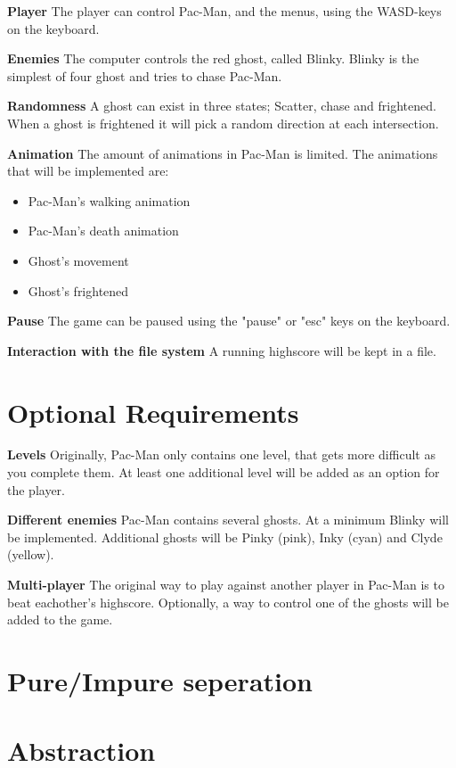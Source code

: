 \documentclass[11pt]{Article}
\begin{document}
\textbf{Player} The player can control Pac-Man, and the menus, using the WASD-keys on the keyboard.

\textbf{Enemies} The computer controls the red ghost, called Blinky. Blinky is the simplest of four ghost and tries to chase Pac-Man.

\textbf{Randomness} A ghost can exist in three states; Scatter, chase and frightened. When a ghost is frightened it will pick a random direction at each intersection.

\textbf{Animation} The amount of animations in Pac-Man is limited. The animations that will be implemented are:
\begin{itemize}
  \item Pac-Man's walking animation
  \item Pac-Man's death animation
  \item Ghost's movement
  \item Ghost's frightened
\end{itemize}

\textbf{Pause} The game can be paused using the "pause" or "esc" keys on the keyboard.

\textbf{Interaction with the file system} A running highscore will be kept in a file.

\section{Optional Requirements} \label{ch:optionalRequirements}

\textbf{Levels} Originally, Pac-Man only contains one level, that gets more difficult as you complete them. At least one additional level will be added as an option for the player.

\textbf{Different enemies} Pac-Man contains several ghosts. At a minimum Blinky will be implemented. Additional ghosts will be Pinky (pink), Inky (cyan) and Clyde (yellow).

\textbf{Multi-player} The original way to play against another player in Pac-Man is to beat eachother's highscore. Optionally, a way to control one of the ghosts will be added to the game.


\section{Pure/Impure seperation} \label{ch:pureSeperation}
\section{Abstraction} \label{ch:abstraction}








\end{document}
